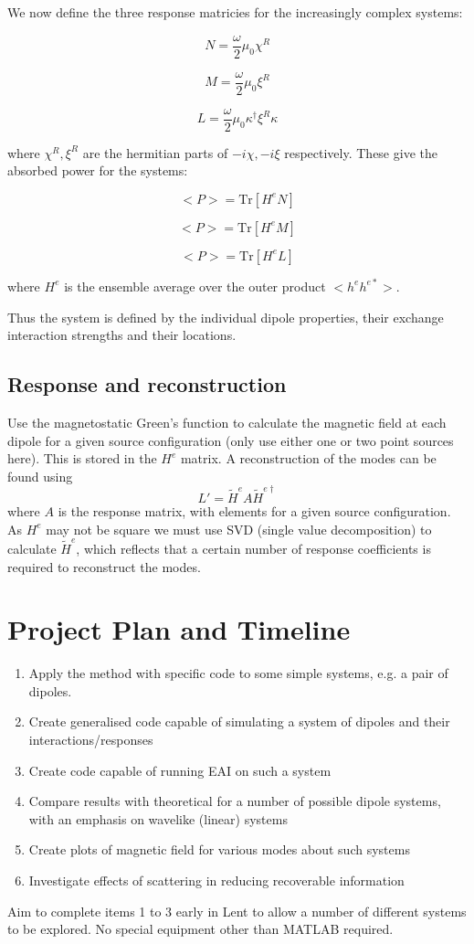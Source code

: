 \documentclass[12pt,twoside,a4paper,english]{article}
\begin{document}
\begin{enumerate}
We now define the three response matricies for the increasingly complex
systems:

\[
N=\frac{\omega}{2}\mu_{0}\chi^{R}
\]

\[
M=\frac{\omega}{2}\mu_{0}\xi^{R}
\]

\[
L=\frac{\omega}{2}\mu_{0}\kappa^{\dag}\xi^{R}\kappa
\]

where $\chi^{R},\xi^{R}$ are the hermitian parts of $-i\chi,-i\xi$
respectively. These give the absorbed power for the systems:

\[
<P>=\textrm{Tr}\left[H^{e}N\right]
\]

\[
<P>=\textrm{Tr}\left[H^{e}M\right]
\]

\[
<P>=\textrm{Tr}\left[H^{e}L\right]
\]

where $H^{e}$ is the ensemble average over the outer product $<h^{e}h^{e*}>$.
\end{enumerate}

Thus the system is defined by the individual dipole properties, their exchange interaction strengths and their locations.

\subsection{Response and reconstruction}
Use the magnetostatic Green's function to calculate the magnetic field at each dipole for a given source configuration (only use either one or two point sources here). This is stored in the \(H^e\) matrix.
A reconstruction of the modes can be found using
\[L' = \widetilde{H}^e A \widetilde{H}^{e\dagger}  \]
where \(A\) is the response matrix, with elements for a given source configuration.
As \(H^e\) may not be square we must use SVD (single value decomposition) to calculate \(\widetilde{H}^e\), which reflects that a certain number of response coefficients is required to reconstruct the modes.


\section{Project Plan and Timeline}
\begin{enumerate}
\item Apply the method with specific code to some simple systems, e.g. a pair of dipoles.
\item Create generalised code capable of simulating a system of dipoles and their interactions/responses
\item Create code capable of running EAI on such a system
\item Compare results with theoretical for a number of possible dipole systems, with an emphasis on wavelike (linear) systems
\item Create plots of magnetic field for various modes about such systems
\item Investigate effects of scattering in reducing recoverable information
\end{enumerate}
Aim to complete items 1 to 3 early in Lent to allow a number of different systems to be explored. No special equipment other than MATLAB required.
\end{document}
